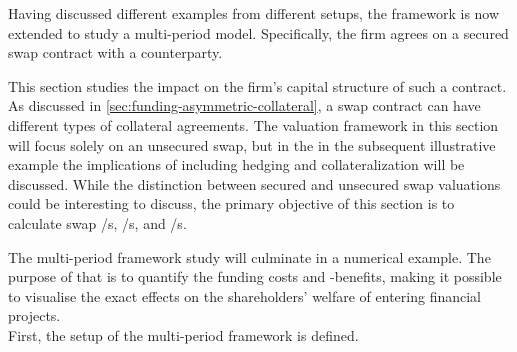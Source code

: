 \documentclass[main.tex]{subfiles}
\begin{document}
    Having discussed different examples from different setups,
    the framework is now extended to study a multi-period model.
    Specifically, the firm agrees on a secured swap contract with a counterparty.
    
    This section studies the impact on the firm's capital structure of such a contract.
    As discussed in \cref{sec:funding-asymmetric-collateral}, a swap contract can have different types of collateral agreements.
    The valuation framework in this section will focus solely on an unsecured swap,
    but in the in the subsequent illustrative example 
    the implications of including hedging and collateralization will be discussed.
    While the distinction between secured and unsecured swap valuations could be interesting to discuss,
    the primary objective of this section is to calculate swap \FVA/s, \CVA/s, and \DVA/s.

    The multi-period framework study will culminate in a numerical example.
    The purpose of that is to quantify the funding costs and -benefits,
    making it possible to visualise the exact effects on the shareholders' welfare of entering financial projects.
    \\
    First, the setup of the multi-period framework is defined.
\end{document}
